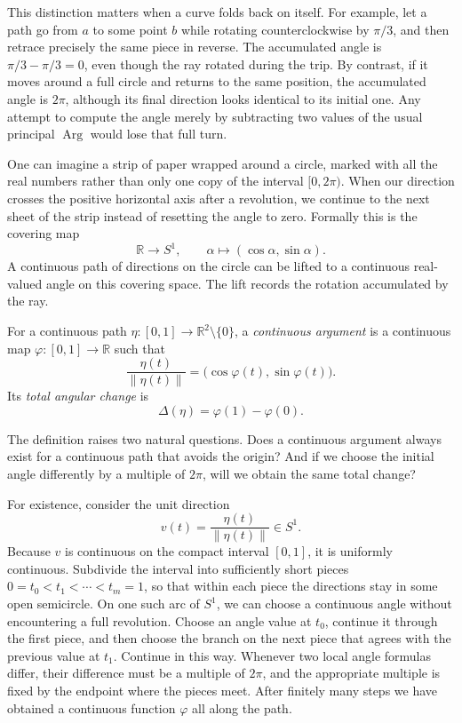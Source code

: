 This distinction matters when a curve folds back on itself. For example, let a path go from \(a\) to some point \(b\) while rotating counterclockwise by \(\pi/3\), and then retrace precisely the same piece in reverse. The accumulated angle is \(\pi/3-\pi/3=0\), even though the ray rotated during the trip. By contrast, if it moves around a full circle and returns to the same position, the accumulated angle is \(2\pi\), although its final direction looks identical to its initial one. Any attempt to compute the angle merely by subtracting two values of the usual principal \(\operatorname{Arg}\) would lose that full turn.

One can imagine a strip of paper wrapped around a circle, marked with all the real numbers rather than only one copy of the interval \([0,2\pi)\). When our direction crosses the positive horizontal axis after a revolution, we continue to the next sheet of the strip instead of resetting the angle to zero. Formally this is the covering map
\[
 \mathbb R\longrightarrow S^1,\qquad
 \alpha\longmapsto(\cos\alpha,\sin\alpha).
\]
A continuous path of directions on the circle can be lifted to a continuous real-valued angle on this covering space. The lift records the rotation accumulated by the ray.

\begin{definition}
For a continuous path $\eta:[0,1]\to\mathbb R^2\setminus\{0\}$, a \emph{continuous argument} is a continuous map $\varphi:[0,1]\to\mathbb R$ such that
\begin{equation}
 \frac{\eta(t)}{\|\eta(t)\|}
 =\bigl(\cos\varphi(t),\sin\varphi(t)\bigr).
 \label{eq:N20261110-lift}
\end{equation}
Its \emph{total angular change} is
\[
 \Delta(\eta)=\varphi(1)-\varphi(0).
\]
\end{definition}

The definition raises two natural questions. Does a continuous argument always exist for a continuous path that avoids the origin? And if we choose the initial angle differently by a multiple of \(2\pi\), will we obtain the same total change?

For existence, consider the unit direction
\[
 v(t)=\frac{\eta(t)}{\|\eta(t)\|}\in S^1.
\]
Because \(v\) is continuous on the compact interval \([0,1]\), it is uniformly continuous. Subdivide the interval into sufficiently short pieces \(0=t_0<t_1<\cdots<t_m=1\), so that within each piece the directions stay in some open semicircle. On one such arc of \(S^1\), we can choose a continuous angle without encountering a full revolution. Choose an angle value at \(t_0\), continue it through the first piece, and then choose the branch on the next piece that agrees with the previous value at \(t_1\). Continue in this way. Whenever two local angle formulas differ, their difference must be a multiple of \(2\pi\), and the appropriate multiple is fixed by the endpoint where the pieces meet. After finitely many steps we have obtained a continuous function \(\varphi\) all along the path.


